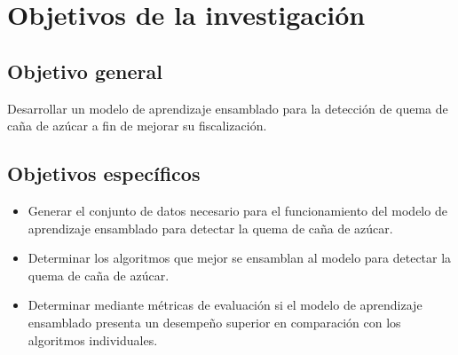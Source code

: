 \section{Objetivos de la investigación}
\subsection{Objetivo general}
Desarrollar un modelo de aprendizaje ensamblado para la detección de quema de caña de azúcar a fin de mejorar su fiscalización.
\subsection{Objetivos específicos}
\begin{itemize}
    \item Generar el conjunto de datos necesario para el funcionamiento del modelo de aprendizaje ensamblado para detectar la quema de caña de azúcar.
    \item Determinar los algoritmos que mejor se ensamblan al modelo para detectar la quema de caña de azúcar.
    \item Determinar mediante métricas de evaluación si el modelo de aprendizaje ensamblado presenta un desempeño superior en comparación con los algoritmos individuales.
\end{itemize}
